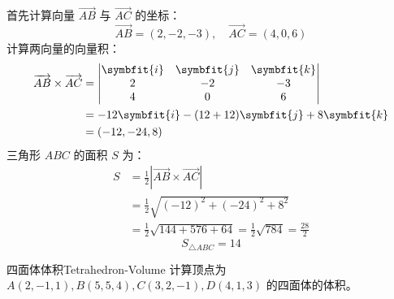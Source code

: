 \begin{solution}
    首先计算向量 $\overrightarrow{AB}$ 与 $\overrightarrow{AC}$ 的坐标：
    \begin{equation}
        \overrightarrow{AB} = (2, -2, -3), \quad \overrightarrow{AC} = (4, 0, 6)
    \end{equation}
    计算两向量的向量积：
    \begin{equation}
        \begin{aligned}
            \overrightarrow{AB} \times \overrightarrow{AC} & = \begin{vmatrix} \symbfit{i} & \symbfit{j} & \symbfit{k} \\ 2 & -2 & -3 \\ 4 & 0 & 6 \end{vmatrix} \\
                                                           & = -12\symbfit{i} - (12 + 12)\symbfit{j} + 8\symbfit{k}                                              \\
                                                           & = (-12, -24, 8)
        \end{aligned}
    \end{equation}
    三角形 $ABC$ 的面积 $S$ 为：
    \begin{equation}
        \begin{aligned}
            S & = \frac{1}{2} \left| \overrightarrow{AB} \times \overrightarrow{AC} \right| \\
              & = \frac{1}{2} \sqrt{(-12)^2 + (-24)^2 + 8^2}                                \\
              & = \frac{1}{2} \sqrt{144 + 576 + 64} = \frac{1}{2} \sqrt{784} = \frac{28}{2}
        \end{aligned}
    \end{equation}
    \begin{equation}
        \boxed{S_{\triangle ABC} = 14}
    \end{equation}
\end{solution}

\begin{problem}{四面体体积}{Tetrahedron-Volume}
    计算顶点为 $A(2, -1, 1), B(5, 5, 4), C(3, 2, -1), D(4, 1, 3)$ 的四面体的体积。
\end{problem}

